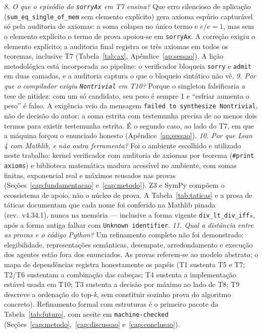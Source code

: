 \textit{8. O que o episódio do \texttt{sorryAx} em T7 ensina?} Que erro silencioso de aplicação (\texttt{sum\_eq\_single\_of\_mem} sem elemento explícito) gera axioma espúrio capturável só pela auditoria de axiomas: a soma colapsa no único termo e $e/e=1$, mas sem o elemento explícito o termo de prova apoiou-se em \texttt{sorryAx}. A correção exigiu o elemento explícito; a auditoria final registra os três axiomas em todos os teoremas, inclusive T7 (Tabela~\ref{tab:ax}, Apêndice~\ref{ap:sessao}). A lição metodológica está incorporada ao pipeline: o verificador bloqueia \texttt{sorry} e \texttt{admit} em duas camadas, e a auditoria captura o que o bloqueio sintático não vê.
\textit{9. Por que o compilador exigiu \texttt{Nontrivial} em T10?} Porque o singleton falsificaria a tese de nitidez: com um só candidato, seu peso é sempre 1 e ``esfriar aumenta o peso'' é falso. A exigência veio da mensagem \nolinkurl{failed to synthesize Nontrivial}, não de decisão do autor: a soma estrita com testemunha precisa de ao menos dois termos para existir testemunha estrita. É o segundo caso, ao lado do T7, em que a máquina forçou o enunciado honesto (Apêndice~\ref{ap:sessao}).
\textit{10. Por que Lean 4 com Mathlib, e não outra ferramenta?} Foi o ambiente escolhido e utilizado neste trabalho: kernel verificador com auditoria de axiomas por teorema (\texttt{\#print axioms}) e biblioteca matemática madura acessível no ambiente, com somas finitas, exponencial real e máximos reusados nas provas (Seções~\ref{cap:fundamentacao} e~\ref{cap:metodo}). Z3 e SymPy compõem o ecossistema de apoio, não o núcleo de prova. A Tabela~\ref{tab:taticas} e a prosa de táticas documentam que cada nome foi conferido na Mathlib pinada (rev.\ v4.34.1), nunca na memória --- inclusive a forma vigente \texttt{div\_lt\_div\_iff₀}, após a forma antiga falhar com \texttt{Unknown identifier}.
\textit{11. Qual a distância entre as provas e o código Python?} Um refinamento completo não foi demonstrado: elegibilidade, representações semânticas, desempate, arredondamento e execução dos agentes estão fora dos enunciados. As provas referem-se ao modelo abstrato; o mapa de dependências registra honestamente os papéis (T1 sustenta T5 e T7; T2/T6 sustentam a combinação das cabeças; T4 sustenta a implementação estável usada em T10; T3 sustenta a decisão por máximo ao lado de T8; T9 descreve a ordenação do top-\textit{k}, sem constituir sozinho prova do algoritmo concreto). Refinamento formal com estruturas é o primeiro pacote da Tabela~\ref{tab:futuro}, com aceite em \texttt{machine-checked} (Seções~\ref{cap:metodo},~\ref{cap:discussao} e~\ref{cap:conclusao}).
